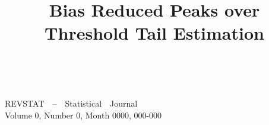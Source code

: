 \documentclass[twoside,leqno,11pt]{article}
\begin{document}
\thispagestyle{firstpage}
\
\vspace{-3.2cm}

\noindent
{\footnotesize {\sffamily REVSTAT~~--~~Statistical~~Journal\\[-1pt]
Volume 0, Number 0, Month 0000,
 000-000}}

\vspace{1.5cm}
\title{Bias Reduced Peaks over Threshold Tail Estimation}
\renewcommand{\titleheading}
             {Bias Reduced Peaks over Threshold Tail Estimation}  %
\end{document}
